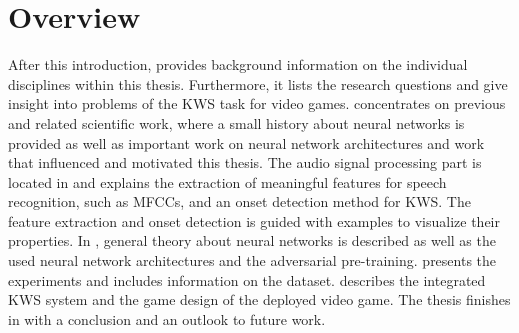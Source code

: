 
\section{Overview}\label{sec:intro_overview}
After this introduction,  provides background information on the individual disciplines within this thesis.
Furthermore, it lists the research questions and give insight into problems of the KWS task for video games.
 concentrates on previous and related scientific work, where a small history about neural networks is provided as well as important work on neural network architectures and work that influenced and motivated this thesis.
The audio signal processing part is located in  and explains the extraction of meaningful features for speech recognition, such as MFCCs, and an onset detection method for KWS.
The feature extraction and onset detection is guided with examples to visualize their properties.
In , general theory about neural networks is described as well as the used neural network architectures and the adversarial pre-training.
 presents the experiments and includes information on the dataset.
 describes the integrated KWS system and the game design of the deployed video game.
The thesis finishes in  with a conclusion and an outlook to future work.